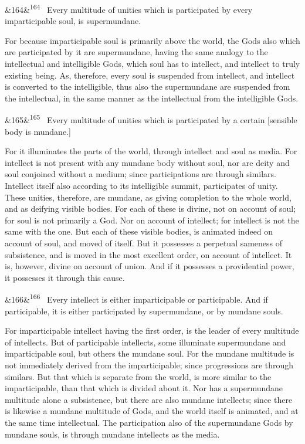 \documentclass[12pt]{article}
\newcommand{\para}[1][]{\par\noindent\ifx&#1&\else\textsuperscript{\footnotesize #1}~\fi}
\begin{document}
\para[164] Every multitude of unities which is participated by every imparticipable soul, is supermundane.

For because imparticipable soul is primarily above the world, the Gods also which are participated by it are supermundane, having the same analogy to the intellectual and intelligible Gods, which soul has to intellect, and intellect to truly existing being. As, therefore, every soul is suspended from intellect, and intellect is converted to the intelligible, thus also the supermundane are suspended from the intellectual, in the same manner as the intellectual from the intelligible Gods.

\para[165] Every multitude of unities which is participated by a certain [sensible body is mundane.]

For it illuminates the parts of the world, through intellect and soul as media. For intellect is not present with any mundane body without soul, nor are deity and soul conjoined without a medium; since participations are through similars. Intellect itself also according to its intelligible summit, participates of unity. These unities, therefore, are mundane, as giving completion to the whole world, and as deifying visible bodies. For each of these is divine, not on account of soul; for soul is not primarily a God. Nor on account of intellect; for intellect is not the same with the one. But each of these visible bodies, is animated indeed on account of soul, and moved of itself. But it possesses a perpetual sameness of subsistence, and is moved in the most excellent order, on account of intellect. It is, however, divine on account of union. And if it possesses a providential power, it possesses it through this cause.

\para[166] Every intellect is either imparticipable or participable. And if participable, it is either participated by supermundane, or by mundane souls.

For imparticipable intellect having the first order, is the leader of every multitude of intellects. But of participable intellects, some illuminate supermundane and imparticipable soul, but others the mundane soul. For the mundane multitude is not immediately derived from the imparticipable; since progressions are through similars. But that which is separate from the world, is more similar to the imparticipable, than that which is divided about it. Nor has a supermundane multitude alone a subsistence, but there are also mundane intellects; since there is likewise a mundane multitude of Gods, and the world itself is animated, and at the same time intellectual. The participation also of the supermundane Gods by mundane souls, is through mundane intellects as the media.
\end{document}
